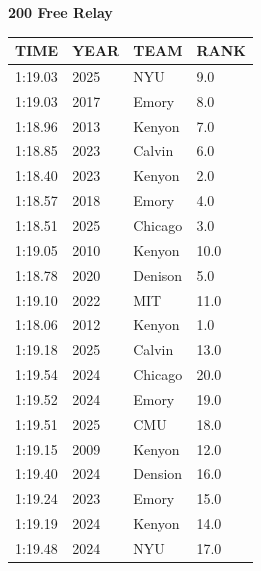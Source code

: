 \begin{table}[H]
\centering
\begin{minipage}[t]{0.6\textwidth}
\centering
\textbf{200 Free Relay}\\[0.1cm]
\begin{tabular}{@{}p{1.8cm}p{1.2cm}p{1.4cm}p{0.8cm}@{}}
\hline
    \textbf{TIME} & \textbf{YEAR} & \textbf{TEAM} & \textbf{RANK} \\
\hline
    1:19.03 & 2025 & NYU & 9.0 \\
    1:19.03 & 2017 & Emory & 8.0 \\
    1:18.96 & 2013 & Kenyon & 7.0 \\
    1:18.85 & 2023 & Calvin & 6.0 \\
    1:18.40 & 2023 & Kenyon & 2.0 \\
    1:18.57 & 2018 & Emory & 4.0 \\
    1:18.51 & 2025 & Chicago & 3.0 \\
    1:19.05 & 2010 & Kenyon & 10.0 \\
    1:18.78 & 2020 & Denison & 5.0 \\
    1:19.10 & 2022 & MIT & 11.0 \\
    1:18.06 & 2012 & Kenyon & 1.0 \\
    1:19.18 & 2025 & Calvin & 13.0 \\
    1:19.54 & 2024 & Chicago & 20.0 \\
    1:19.52 & 2024 & Emory & 19.0 \\
    1:19.51 & 2025 & CMU & 18.0 \\
    1:19.15 & 2009 & Kenyon & 12.0 \\
    1:19.40 & 2024 & Dension & 16.0 \\
    1:19.24 & 2023 & Emory & 15.0 \\
    1:19.19 & 2024 & Kenyon & 14.0 \\
    1:19.48 & 2024 & NYU & 17.0 \\
\hline
\end{tabular}
\end{minipage}
\end{table}


